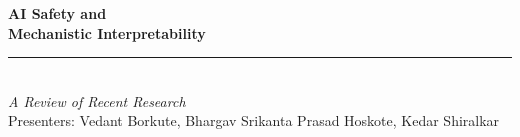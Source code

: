 {
\begin{frame}[plain]
  \vspace*{1.8cm}
  \hspace*{0.5cm}
  \begin{minipage}{0.88\textwidth}
    {\color{white}\fontsize{34}{40}\selectfont\bfseries
      AI Safety and\\[0.1em]
      Mechanistic Interpretability}\\[0.5em]
    {\color{UCRgold}\rule{0.6\textwidth}{1.5pt}}\\[0.4em]
    {\color{UCRgold}\large\itshape A Review of Recent Research}\\[0.3em]
    {\color{UCRmgray}\small
      Presenters: Vedant Borkute, Bhargav Srikanta Prasad Hoskote, Kedar Shiralkar}
  \end{minipage}
  \vfill
  \hspace*{0.5cm}

  \vspace*{0.4cm}
\end{frame}
}

